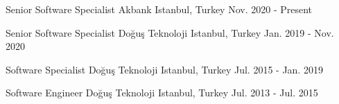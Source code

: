 

\begin{cventries}

  \cventry
    {Senior Software Specialist} %
    {Akbank} %
    {Istanbul, Turkey} %
    {Nov. 2020 - Present} %
    {}

  \cventry
    {Senior Software Specialist} %
    {Doğuş Teknoloji} %
    {Istanbul, Turkey} %
    {Jan. 2019 - Nov. 2020} %
    {}

  \cventry
    {Software Specialist} %
    {Doğuş Teknoloji} %
    {Istanbul, Turkey} %
    {Jul. 2015 - Jan. 2019} %
    {}

  \cventry
    {Software Engineer} %
    {Doğuş Teknoloji} %
    {Istanbul, Turkey} %
    {Jul. 2013 - Jul. 2015} %
    {}

\end{cventries}
